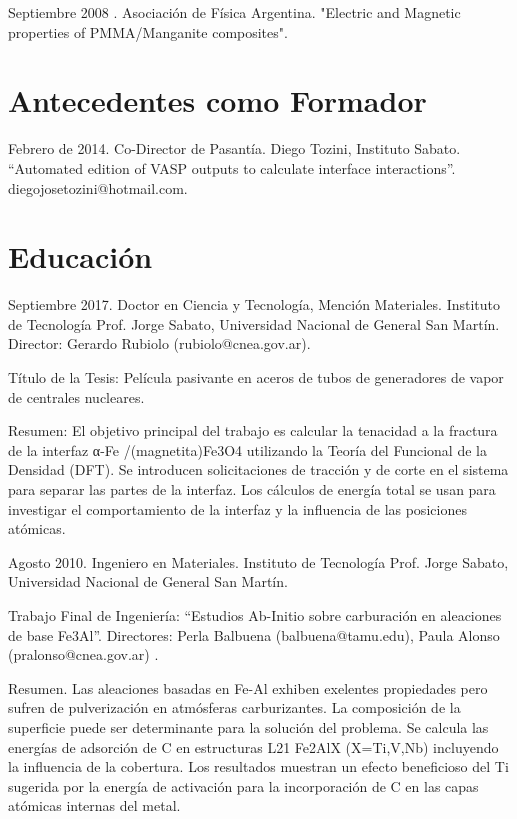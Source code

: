 Septiembre 2008 . Asociación de Física Argentina. "Electric and Magnetic
properties of PMMA/Manganite composites".

\section{Antecedentes como Formador}\label{antecedentes-como-formador}

Febrero de 2014. Co-Director de Pasantía. Diego Tozini, Instituto
Sabato. ``Automated edition of VASP outputs to calculate interface
interactions''. diegojosetozini@hotmail.com.

\section{Educación}\label{educaciuxf3n}

Septiembre 2017. Doctor en Ciencia y Tecnología, Mención Materiales.
Instituto de Tecnología Prof. Jorge Sabato, Universidad Nacional de
General San Martín. Director: Gerardo Rubiolo (rubiolo@cnea.gov.ar).

Título de la Tesis: Película pasivante en aceros de tubos de generadores
de vapor de centrales nucleares.

Resumen: El objetivo principal del trabajo es calcular la tenacidad a la
fractura de la interfaz α-Fe /(magnetita)Fe3O4 utilizando la Teoría del
Funcional de la Densidad (DFT). Se introducen solicitaciones de tracción
y de corte en el sistema para separar las partes de la interfaz. Los
cálculos de energía total se usan para investigar el comportamiento de
la interfaz y la influencia de las posiciones atómicas.

Agosto 2010. Ingeniero en Materiales. Instituto de Tecnología Prof.
Jorge Sabato, Universidad Nacional de General San Martín.

Trabajo Final de Ingeniería: ``Estudios Ab-Initio sobre carburación en
aleaciones de base Fe3Al''. Directores: Perla Balbuena
(balbuena@tamu.edu), Paula Alonso (pralonso@cnea.gov.ar) .

Resumen. Las aleaciones basadas en Fe-Al exhiben exelentes propiedades
pero sufren de pulverización en atmósferas carburizantes. La composición
de la superficie puede ser determinante para la solución del problema.
Se calcula las energías de adsorción de C en estructuras L21 Fe2AlX
(X=Ti,V,Nb) incluyendo la influencia de la cobertura. Los resultados
muestran un efecto beneficioso del Ti sugerida por la energía de
activación para la incorporación de C en las capas atómicas internas del
metal.


